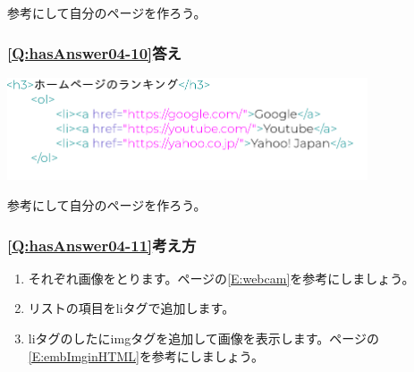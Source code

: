 \documentclass[a4paper,12pt]{jarticle}
\begin{document}
\bigskip

参考にして自分のページを作ろう。


\bigskip

\subsubsection{\bfseries
\ref*{Q:hasAnswer04-10}答え}


\centering
\includegraphics[width=0.8\textwidth]{textbook-img241.png}
\flushleft

\bigskip

\centering
{}
\flushleft

\bigskip
参考にして自分のページを作ろう。

\clearpage\subsubsection{\bfseries
\ref*{Q:hasAnswer04-11}考え方}

\begin{enumerate}
  \item
        それぞれ画像をとります。\pageref*{E:webcam}ページの\ref*{E:webcam}を参考にしましょう。
  \item リストの項目をliタグで追加します。
  \item
        liタグのしたにimgタグを追加して画像を表示します。\pageref*{E:embImginHTML}ページの\ref*{E:embImginHTML}を参考にしましょう。
\end{enumerate}
\centering
{}
\flushleft
\end{document}
